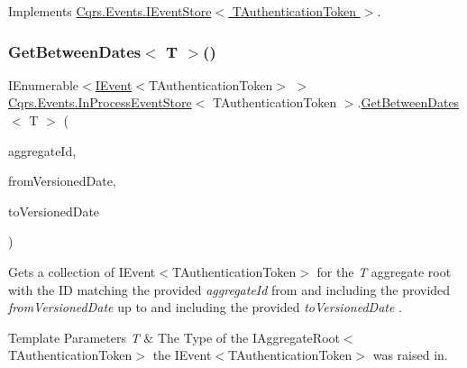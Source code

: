 Implements \hyperlink{interfaceCqrs_1_1Events_1_1IEventStore_a0575ba2cce945342dc261eb2286c8a41_a0575ba2cce945342dc261eb2286c8a41}{Cqrs.\+Events.\+I\+Event\+Store$<$ T\+Authentication\+Token $>$}.

\mbox{\label{classCqrs_1_1Events_1_1InProcessEventStore_a07534ebbda76f4a40c1386866afe0f6d_a07534ebbda76f4a40c1386866afe0f6d}} 
\subsubsection{\texorpdfstring{Get\+Between\+Dates$<$ T $>$()}{GetBetweenDates< T >()}}
{\footnotesize\ttfamily I\+Enumerable$<$\hyperlink{interfaceCqrs_1_1Events_1_1IEvent}{I\+Event}$<$T\+Authentication\+Token$>$ $>$ \hyperlink{classCqrs_1_1Events_1_1InProcessEventStore}{Cqrs.\+Events.\+In\+Process\+Event\+Store}$<$ T\+Authentication\+Token $>$.\hyperlink{classCqrs_1_1Events_1_1InProcessEventStore_a74dd36fca8006f2c739b2675c677c1ec_a74dd36fca8006f2c739b2675c677c1ec}{Get\+Between\+Dates}$<$ T $>$ (\begin{DoxyParamCaption}\item[{Guid}]{aggregate\+Id,  }\item[{Date\+Time}]{from\+Versioned\+Date,  }\item[{Date\+Time}]{to\+Versioned\+Date }\end{DoxyParamCaption})}



Gets a collection of I\+Event$<$\+T\+Authentication\+Token$>$ for the {\itshape T} aggregate root with the ID matching the provided {\itshape aggregate\+Id}  from and including the provided {\itshape from\+Versioned\+Date}  up to and including the provided {\itshape to\+Versioned\+Date} . 


\begin{DoxyTemplParams}{Template Parameters}
{\em T} & The Type of the I\+Aggregate\+Root$<$\+T\+Authentication\+Token$>$ the I\+Event$<$\+T\+Authentication\+Token$>$ was raised in.\\
\hline
\end{DoxyTemplParams}

